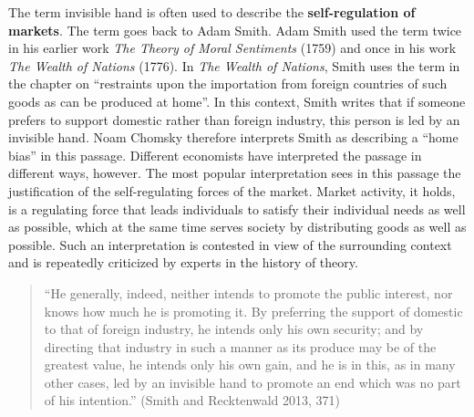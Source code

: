 \documentclass[
  british,
  a4paper,
  DIV=11,
  numbers=noendperiod,
  oneside,
  openany]{scrreprt}
\begin{document}
\begin{tcolorbox}
\end{tcolorbox}

\begin{tcolorbox}[enhanced jigsaw, arc=.35mm, bottomrule=.15mm, bottomtitle=1mm, breakable, colback=white, colbacktitle=quarto-callout-tip-color!10!white, colframe=quarto-callout-tip-color-frame, coltitle=black, left=2mm, leftrule=.75mm, opacityback=0, opacitybacktitle=0.6, rightrule=.15mm, title={Excursus: The invisible hand of the market}, titlerule=0mm, toprule=.15mm, toptitle=1mm]

The term invisible hand is often used to describe the
\textbf{self-regulation of markets}. The term goes back to Adam Smith.
Adam Smith used the term twice in his earlier work \emph{The Theory of
Moral Sentiments} (1759) and once in his work \emph{The Wealth of
Nations} (1776). In \emph{The Wealth of Nations}, Smith uses the term in
the chapter on ``restraints upon the importation from foreign countries
of such goods as can be produced at home''. In this context, Smith
writes that if someone prefers to support domestic rather than foreign
industry, this person is led by an invisible hand. Noam Chomsky
therefore interprets Smith as describing a ``home bias'' in this
passage. Different economists have interpreted the passage in different
ways, however. The most popular interpretation sees in this passage the
justification of the self-regulating forces of the market. Market
activity, it holds, is a regulating force that leads individuals to
satisfy their individual needs as well as possible, which at the same
time serves society by distributing goods as well as possible. Such an
interpretation is contested in view of the surrounding context and is
repeatedly criticized by experts in the history of theory.

\begin{quote}
``He generally, indeed, neither intends to promote the public interest,
nor knows how much he is promoting it. By preferring the support of
domestic to that of foreign industry, he intends only his own security;
and by directing that industry in such a manner as its produce may be of
the greatest value, he intends only his own gain, and he is in this, as
in many other cases, led by an invisible hand to promote an end which
was no part of his intention.'' (Smith and Recktenwald 2013, 371)
\end{quote}

\end{tcolorbox}
\end{document}
